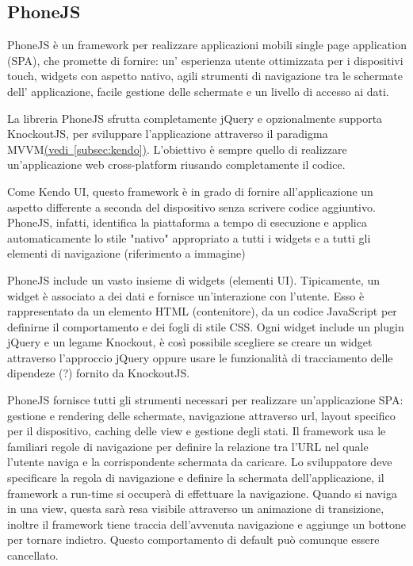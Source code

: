 		\subsection{PhoneJS}
			PhoneJS è un framework per realizzare applicazioni mobili 
			single page application (SPA), che promette di fornire: un'
			esperienza utente ottimizzata per i dispositivi touch, widgets con 
			aspetto nativo, agili strumenti di navigazione tra le schermate dell'
			applicazione, facile gestione delle schermate e un livello di accesso 
			ai dati.
			
			La libreria PhoneJS sfrutta completamente jQuery e opzionalmente 
			supporta KnockoutJS, per sviluppare l'applicazione attraverso il paradigma 
			MVVM\hyperref[subsec:kendo]{(vedi~\ref{subsec:kendo})}.
			L'obiettivo è sempre quello di realizzare un'applicazione web cross-platform 
			riusando completamente il codice.
			
			Come Kendo UI, questo framework è in grado di fornire all'applicazione 
			un aspetto differente a seconda del dispositivo senza scrivere codice aggiuntivo.
			PhoneJS, infatti, identifica la piattaforma a tempo di esecuzione 
			e applica automaticamente 
			lo stile "nativo" appropriato a tutti i widgets e a tutti gli elementi 
			di navigazione (riferimento a immagine)
			
			PhoneJS include un vasto insieme di widgets (elementi UI). Tipicamente, 
			un widget è associato a dei dati e fornisce un'interazione con l'utente.
			Esso è rappresentato da un elemento HTML (contenitore), da un codice 
			JavaScript per definirne il comportamento e dei fogli di stile CSS. 
			Ogni widget include un plugin jQuery e un legame Knockout, è così 
			possibile scegliere se creare un widget attraverso l'approccio jQuery 
			oppure usare le funzionalità di tracciamento delle dipendeze (?) fornito 
			da KnockoutJS. 
			
			PhoneJS fornisce tutti gli strumenti necessari per realizzare un'applicazione 
			SPA: gestione e rendering delle schermate, navigazione attraverso url, 
			layout specifico per il dispositivo, caching delle view e gestione degli stati.
			Il framework usa le familiari regole di navigazione per definire la 
			relazione tra l'URL nel quale l'utente naviga e la corrispondente schermata 
			da caricare. Lo sviluppatore deve specificare la regola di navigazione e definire 
			la schermata dell'applicazione, il framework a run-time si occuperà di effettuare la 
			navigazione.
			Quando si naviga in una view, questa sarà resa visibile attraverso un 
			animazione di transizione, inoltre il framework tiene traccia dell'avvenuta 
			navigazione e aggiunge un bottone per tornare indietro. Questo comportamento 
			di default può comunque essere cancellato.
			
